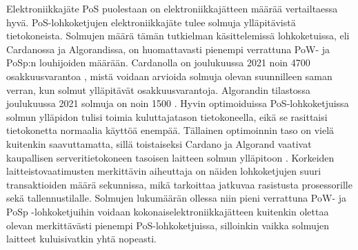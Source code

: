 \begin{section}{Elektroniikkajäte\label{elektroniikkajate}}
PoS puolestaan on elektroniikkajätteen määrää vertailtaessa hyvä. PoS-lohkoketjujen elektroniikkajäte tulee solmuja ylläpitävistä tietokoneista. Solmujen määrä tämän tutkielman käsittelemissä lohkoketuissa, eli Cardanossa ja Algorandissa, on huomattavasti pienempi verrattuna PoW- ja PoSp:n louhijoiden määrään. Cardanolla on joulukuussa 2021 noin 4700 osakkuusvarantoa \cite{cardano-staking-pools}, mistä voidaan arvioida solmuja olevan suunnilleen saman verran, kun solmut ylläpitävät osakkuusvarantoja. Algorandin tilastossa joulukuussa 2021 solmuja on noin 1500 \cite{algorand-tps-nodes-etc}. Hyvin optimoiduissa 
PoS-lohkoketjuissa solmun ylläpidon tulisi toimia kuluttajatason tietokoneella, eikä se rasittaisi tietokonetta normaalia käyttöä enempää. Tällainen optimoinnin taso on vielä kuitenkin saavuttamatta, sillä toistaiseksi Cardano ja Algorand vaativat kaupallisen serveritietokoneen tasoisen laitteen solmun ylläpitoon \cite{algorand-energy}. Korkeiden laitteistovaatimusten merkittävin aiheuttaja on näiden lohkoketjujen suuri transaktioiden määrä sekunnissa, mikä tarkoittaa jatkuvaa rasistusta prosessorille sekä tallennustilalle. Solmujen lukumäärän ollessa niin pieni verrattuna PoW- ja PoSp -lohkoketjuihin voidaan kokonaiselektroniikkajätteen kuitenkin olettaa olevan merkittävästi pienempi PoS-lohkoketjuissa, silloinkin vaikka solmujen laitteet kuluisivatkin yhtä nopeasti.

\end{section}